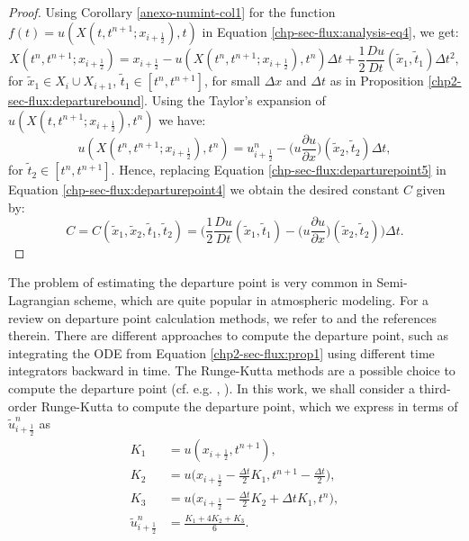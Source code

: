 \begin{proof}
Using Corollary \ref{anexo-numint-col1} for the function $f(t) = u(X(t,t^{n+1};x_{i+\frac{1}{2}}),t)$
in Equation  \eqref{chp-sec-flux:analysis-eq4}, we get:
\begin{equation}
	\label{chp-sec-flux:departurepoint4}
	X(t^n,t^{n+1};x_{i+\frac{1}{2}}) = x_{i+\frac{1}{2}} - u(X(t^n,t^{n+1};x_{i+\frac{1}{2}}),t^n)\Delta t + \frac{1}{2}\frac{Du}{Dt}(\tilde{x}_1,\tilde{t}_1)\Delta t^2,
\end{equation}
for $\tilde{x}_1 \in X_i \cup X_{i+1}$, $\tilde{t}_1 \in [t^n, t^{n+1}]$, for small $\Delta x$ and $\Delta t$ as in Proposition \ref{chp2-sec-flux:departurebound}.
Using the Taylor's expansion of $u(X(t,t^{n+1};x_{i+\frac{1}{2}}),t^n)$ we have:
\begin{equation}
	\label{chp-sec-flux:departurepoint5}
	u(X(t^n,t^{n+1};x_{i+\frac{1}{2}}),t^n) = u^n_{i+\frac{1}{2}} - \bigg(u\frac{\partial u}{\partial x}\bigg)(\tilde{x}_2,\tilde{t}_2)\Delta t,
\end{equation}
for $\tilde{t}_2 \in [t^n, t^{n+1}]$.
Hence, replacing Equation \eqref{chp-sec-flux:departurepoint5} in Equation \eqref{chp-sec-flux:departurepoint4} 
we obtain the desired constant $C$ given by:
\begin{equation}
	\label{chp-sec-flux:departurepoint6}
	C =  C(\tilde{x}_1, \tilde{x}_2, \tilde{t}_1, \tilde{t}_2) = 
	\bigg( \frac{1}{2}\frac{Du}{Dt}(\tilde{x}_1,\tilde{t}_1) - \bigg(u\frac{\partial u}{\partial x}\bigg)(\tilde{x}_2,\tilde{t}_2)\bigg)\Delta t.
\end{equation}
\end{proof}
The problem of estimating the departure point is very common in Semi-Lagrangian scheme, which are quite popular in 
atmospheric modeling.
For a review on departure point calculation methods, we refer to  \citet[Chapter 3]{tumolo:2011} and the references therein. 
There are different approaches to compute the departure point, such as integrating the ODE from Equation \ref{chp2-sec-flux:prop1}
using different time integrators \citep{durran:2011} backward in time.
The Runge-Kutta methods are a possible choice to compute the departure point (cf. e.g. \citet{guo:2014}, \citet{lu:2022}). In this work,
we shall consider a third-order Runge-Kutta to compute the departure point, which we express in terms of $\tilde{u}^n_{i+\frac{1}{2}}$ as
\begin{align}
	\label{chp-sec-flux:dp_RK3}		
	K_1 &= u(x_{i+\frac{1}{2}},t^{n+1}), \nonumber \\
	K_2 &= u\big(x_{i+\frac{1}{2}}-\frac{\Delta t}{2}K_1,t^{n+1}-\frac{\Delta t}{2}\big), \nonumber \\
	K_3 &= u\big(x_{i+\frac{1}{2}}-\frac{\Delta t}{2}K_2+{\Delta t}K_1,t^{n}\big), \nonumber\\
	\tilde{u}^n_{i+\frac{1}{2}} &= \frac{K_1+4K_2+K_3}{6}.
\end{align}
